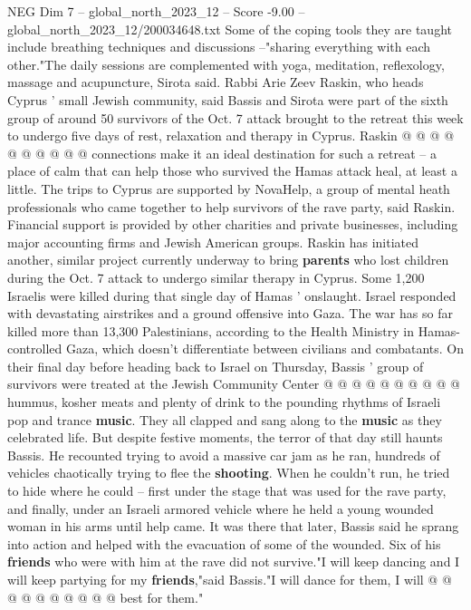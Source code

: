 \begin{textsample}{NEG Dim 7 – global\_north\_2023\_12 – Score -9.00 – global\_north\_2023\_12/200034648.txt}
Some of the coping tools they are taught include breathing techniques and discussions --"sharing everything with each other."The daily sessions are complemented with yoga, meditation, reflexology, massage and acupuncture, Sirota said.
Rabbi Arie Zeev Raskin, who heads Cyprus ' small Jewish community, said Bassis and Sirota were part of the sixth group of around 50 survivors of the Oct. 7 attack brought to the retreat this week to undergo five days of rest, relaxation and therapy in Cyprus.
Raskin @ @ @ @ @ @ @ @ @ @ connections make it an ideal destination for such a retreat -- a place of calm that can help those who survived the Hamas attack heal, at least a little.
The trips to Cyprus are supported by NovaHelp, a group of mental heath professionals who came together to help survivors of the rave party, said Raskin.
Financial support is provided by other charities and private businesses, including major accounting firms and Jewish American groups.
Raskin has initiated another, similar project currently underway to bring \textbf{parents} who lost children during the Oct. 7 attack to undergo similar therapy in Cyprus.
Some 1,200 Israelis were killed during that single day of Hamas ' onslaught.
Israel responded with devastating airstrikes and a ground offensive into Gaza.
The war has so far killed more than 13,300 Palestinians, according to the Health Ministry in Hamas-controlled Gaza, which doesn't differentiate between civilians and combatants.
On their final day before heading back to Israel on Thursday, Bassis ' group of survivors were treated at the Jewish Community Center @ @ @ @ @ @ @ @ @ @ hummus, kosher meats and plenty of drink to the pounding rhythms of Israeli pop and trance \textbf{music}.
They all clapped and sang along to the \textbf{music} as they celebrated life.
But despite festive moments, the terror of that day still haunts Bassis.
He recounted trying to avoid a massive car jam as he ran, hundreds of vehicles chaotically trying to flee the \textbf{shooting}.
When he couldn't run, he tried to hide where he could -- first under the stage that was used for the rave party, and finally, under an Israeli armored vehicle where he held a young wounded woman in his arms until help came.
It was there that later, Bassis said he sprang into action and helped with the evacuation of some of the wounded.
Six of his \textbf{friends} who were with him at the rave did not survive."I will keep dancing and I will keep partying for my \textbf{friends},"said Bassis."I will dance for them, I will @ @ @ @ @ @ @ @ @ @ best for them."

\end{textsample}
